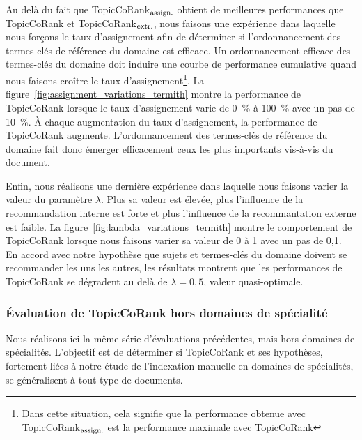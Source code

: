         Au delà du fait que TopicCoRank$_\textnormal{assign.}$ obtient de
        meilleures performances que TopicCoRank et
        TopicCoRank$_\textnormal{extr.}$, nous faisons une expérience dans
        laquelle nous forçons le taux d'assignement afin de déterminer si
        l'ordonnancement des termes-clés de référence du domaine est efficace.
        Un ordonnancement efficace des termes-clés du domaine doit induire une
        courbe de performance cumulative quand nous faisons croître le taux
        d'assignement\footnote{Dans cette situation, cela signifie que la
        performance obtenue avec TopicCoRank$_\textnormal{assign.}$ est la
        performance maximale avec TopicCoRank}. La
        figure~\ref{fig:assignment_variations_termith} montre la performance de
        TopicCoRank lorsque le taux d'assignement varie de 0~\% à 100~\% avec un
        pas de 10~\%. À chaque augmentation du taux d'assignement, la
        performance de TopicCoRank augmente. L'ordonnancement des termes-clés de
        référence du domaine fait donc émerger efficacement ceux les plus
        importants vis-à-vis du document.
        

        Enfin, nous réalisons une dernière expérience dans laquelle nous faisons
        varier la valeur du paramètre $\lambda$. Plus sa valeur est élevée, plus
        l'influence de la recommandation interne est forte et plus l'influence
        de la recommantation externe est faible. La
        figure~\ref{fig:lambda_variations_termith} montre le comportement de
        TopicCoRank lorsque nous faisons varier sa valeur de 0 à 1
        avec un pas de 0,1. En accord avec notre hypothèse que sujets et
        termes-clés du domaine doivent se recommander les uns les autres, les
        résultats montrent que les performances de TopicCoRank se dégradent au
        delà de $\lambda = 0,5$, valeur quasi-optimale.
        
      
      \subsubsection{Évaluation de TopicCoRank hors domaines de spécialité}
      \label{subsubsec:main-domain_specific_keyphrase_annotation-supervised_automatic_keyphrase_annotation-evaluation-topiccorank_indepent_domains}
        Nous réalisons ici la même série d'évaluations précédentes, mais hors
        domaines de spécialités. L'objectif est de déterminer si TopicCoRank et
        ses hypothèses, fortement liées à notre étude de l'indexation manuelle
        en domaines de spécialités, se généralisent à tout type de documents.

